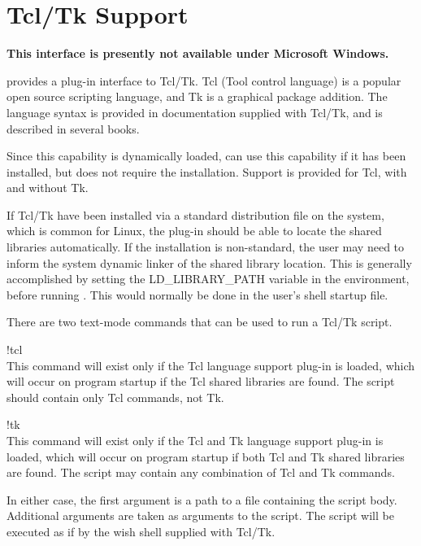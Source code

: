 \section{Tcl/Tk Support}
\label{tcltk}

{\bf This interface is presently not available under Microsoft Windows.}

{\Xic} provides a plug-in interface to Tcl/Tk.  Tcl (Tool control
language) is a popular open source scripting language, and Tk is a
graphical package addition.  The language syntax is provided in
documentation supplied with Tcl/Tk, and is described in several books.

Since this capability is dynamically loaded, {\Xic} can use this
capability if it has been installed, but does not require the
installation.  Support is provided for Tcl, with and without Tk.

If Tcl/Tk have been installed via a standard distribution file on the
system, which is common for Linux, the plug-in should be able to
locate the shared libraries automatically.  If the installation is
non-standard, the user may need to inform the system dynamic linker of
the shared library location.  This is generally accomplished by
setting the {\et LD\_LIBRARY\_PATH} variable in the environment,
before running {\Xic}.  This would normally be done in the user's
shell startup file.

There are two text-mode commands that can be used to run a Tcl/Tk
script.

\begin{description}
\item{\cb !tcl}\\
This command will exist only if the Tcl language support plug-in is
loaded, which will occur on program startup if the Tcl shared
libraries are found.  The script should contain only Tcl commands, not
Tk.

\item{\cb !tk}\\
This command will exist only if the Tcl and Tk language support
plug-in is loaded, which will occur on program startup if both Tcl and
Tk shared libraries are found.  The script may contain any combination
of Tcl and Tk commands.
\end{description}

In either case, the first argument is a path to a file containing the
script body.  Additional arguments are taken as arguments to the
script.  The script will be executed as if by the {\et wish} shell
supplied with Tcl/Tk.

